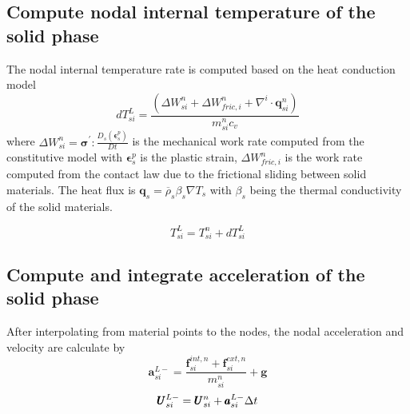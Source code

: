 \documentclass[preprint,12pt]{elsarticle}
\begin{document}
\subsection{\textsf{Compute nodal internal temperature of the solid phase}}
%
%
The nodal internal temperature rate is computed based on the heat conduction model
%
%
\begin{equation}
     dT_{si}^L = \frac{(\Delta W_{si}^n + \Delta W_{fric,i}^n + \nabla^i \cdot \pmb{q}_{si}^n)}{m_{si}^n c_v}
\end {equation}
%
%
where $\Delta W_{si}^n = \pmb{\sigma}^\prime : \frac{D_s( \pmb{\epsilon}_s^p)}{Dt} $ is the mechanical work rate computed from the constitutive model with $\pmb{\epsilon}_s^p$ is the plastic strain, $ \Delta W_{fric,i}^n$ is the work rate computed from the contact law due to the frictional sliding between solid materials. The heat flux is $\pmb{q}_s = \overline{\rho}_s \beta_s \nabla T_s$ with $\beta_s$ being the thermal conductivity of the solid materials.

\begin{equation}
     T_{si}^L = T_{si}^n + dT_{si}^L
\end {equation}
%
%
\subsection{\textsf{Compute and integrate acceleration of the solid phase}}
After interpolating from material points to the nodes, the nodal acceleration and velocity are calculate by
%
%
\begin{equation}
     \pmb{a}_{si}^{L-} = \frac{\pmb{f}_{si}^{int,n} + \pmb{f}_{si}^{ext,n}}{m_{si}^n} + \pmb{g}
\end {equation}
\begin{equation}
     \pmb{U}_{si}^{L-} = \pmb{U}_{si}^n + \pmb{a}_{si}^{L-} \Delta{t}
\end {equation}
%
%
\end{document}
